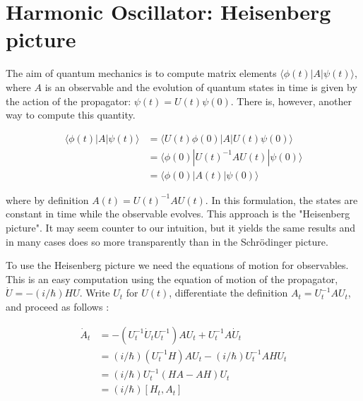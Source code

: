

\setcounter{section}{17}


\section{Harmonic Oscillator: Heisenberg picture}

\innertableofcontents


The aim of quantum mechanics is to compute matrix elements $\langle \phi(t) | A | \psi(t) \rangle$, where $A$ is an observable and the evolution of quantum states in time is given by the action of the propagator: $\psi(t) = U(t)\psi(0)$.  There is, however, another way to compute this quantity.

\begin{align}
\langle \phi(t) | A | \psi(t) \rangle &= \langle U(t) \phi(0) | A | U(t) \psi(0) \rangle \\
&= \langle \phi(0) | U(t) ^{-1}A U(t) |  \psi(0) \rangle \\
&= \langle \phi(0) | A(t)|  \psi(0) \rangle
\end{align}

where by definition $A(t) = U(t) ^{-1}A U(t)$. In this formulation,
the states are constant in time while the observable evolves.
This approach is the "Heisenberg picture". It may seem counter to our intuition, but it yields the same results and in many cases does so more transparently than in the Schrödinger picture.

To use the Heisenberg picture we need the equations of motion for observables.  This is an easy computation using the equation of motion of the propagator, $\dot U = -(i/\hbar) HU$.  Write $U_t$ for $U(t)$, differentiate the definition $A_t = U_t^{-1}A U_t$, and proceed as follows :

\begin{align}
\dot A_t &= - (U_t^{-1}  \dot U_t U_t^{-1} ) A U_t + U_t^{-1}A\dot U_t \\
&=  (i/\hbar)(U_t^{-1}  H) A U_t - (i/\hbar) U_t^{-1}A HU_t \\
&=  (i/\hbar)U_t^{-1} (HA - AH)U_t  \\
&=  (i/\hbar)[H_t ,A_t]
\end{align}

